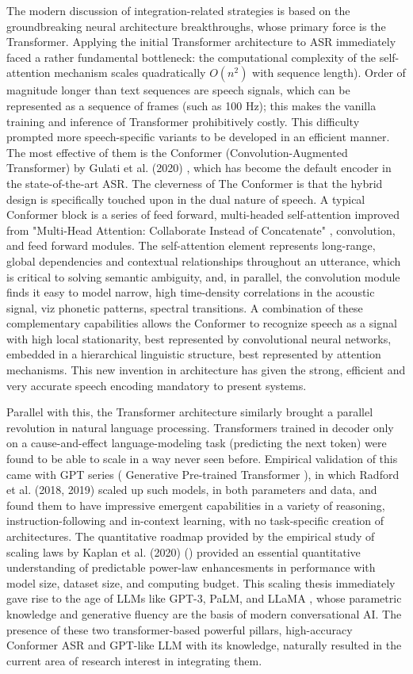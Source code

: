 The modern discussion of integration-related strategies is based on the groundbreaking neural architecture breakthroughs, whose primary force is the Transformer. Applying the initial Transformer architecture to ASR immediately faced a rather fundamental bottleneck: the computational complexity of the self-attention mechanism scales quadratically $O(n^2)$ with sequence length). Order of magnitude longer than text sequences are speech signals, which can be represented as a sequence of frames (such as 100 Hz); this makes the vanilla training and inference of Transformer prohibitively costly. This difficulty prompted more speech-specific variants to be developed in an efficient manner. The most effective of them is the Conformer (Convolution-Augmented Transformer) by Gulati et al. (2020) \cite{conformer}, which has become the default encoder in the state-of-the-art ASR. The cleverness of The Conformer is that the hybrid design is specifically touched upon in the dual nature of speech. A typical Conformer block is a series of feed forward, multi-headed self-attention improved from "Multi-Head Attention: Collaborate Instead of Concatenate" \cite{MHSA,mha}, convolution, and feed forward modules. The self-attention element represents long-range, global dependencies and contextual relationships throughout an utterance, which is critical to solving semantic ambiguity, and, in parallel, the convolution module finds it easy to model narrow, high time-density correlations in the acoustic signal, viz phonetic patterns, spectral transitions. A combination of these complementary capabilities allows the Conformer to recognize speech as a signal with high local stationarity, best represented by convolutional neural networks, embedded in a hierarchical linguistic structure, best represented by attention mechanisms. This new invention in architecture has given the strong, efficient and very accurate speech encoding mandatory to present systems.

Parallel with this, the Transformer architecture similarly brought a parallel revolution in natural language processing. Transformers trained in decoder only on a cause-and-effect language-modeling task (predicting the next token) were found to be able to scale in a way never seen before. Empirical validation of this came with GPT series ( Generative Pre-trained Transformer ), in which Radford et al. (2018, 2019) \cite{gpt} scaled up such models, in both parameters and data, and found them to have impressive emergent capabilities in a variety of reasoning, instruction-following and in-context learning, with no task-specific creation of architectures. The quantitative roadmap provided by the empirical study of scaling laws by Kaplan et al. (2020) (\cite{scaling-kaplan}) provided an essential quantitative understanding of predictable power-law enhancesments in performance with model size, dataset size, and computing budget. This scaling thesis immediately gave rise to the age of LLMs like GPT-3, PaLM, and LLaMA \cite{llama}, whose parametric knowledge and generative fluency are the basis of modern conversational AI. The presence of these two transformer-based powerful pillars, high-accuracy Conformer ASR and GPT-like LLM with its knowledge, naturally resulted in the current area of research interest in integrating them.


